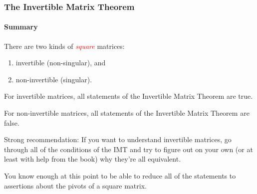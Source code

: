 \begin{frame}
\frametitle{The Invertible Matrix Theorem}
\framesubtitle{Summary}

There are two kinds of \textcolor{red}{\emph{square}} matrices:
\pause
\begin{enumerate}
\item invertible (non-singular), and
\pause
\item non-invertible (singular).
\end{enumerate}

\pause\bigskip
For invertible matrices, all statements of the Invertible Matrix Theorem are true.

\pause\bigskip
For non-invertible matrices, all statements of the Invertible Matrix Theorem are
false.

\pause\bigskip
\alert{Strong recommendation:} 
If you want to understand invertible matrices, go through all of the conditions
of the IMT and try to figure out on your own (or at least with help from the
book) why they're all equivalent.

\pause\bigskip
You know enough at this point to be able to reduce all of the statements to
assertions about the pivots of a square matrix.

\end{frame}


